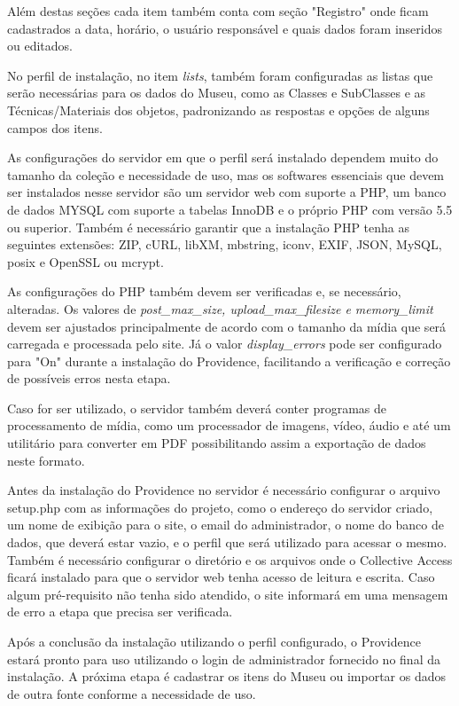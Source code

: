 \documentclass[a4paper,12pt,oneside,onecolumn,final,fleqn]{repUERJ}
\begin{document}
Além destas seções cada item também conta com seção "Registro" onde ficam cadastrados a data, horário, o usuário responsável e quais dados foram inseridos ou editados.

No perfil de instalação, no item \textit{lists}, também foram configuradas as listas que serão necessárias para os dados do Museu, como as Classes e SubClasses e as Técnicas/Materiais dos objetos, padronizando as respostas e opções de alguns campos dos itens.

As configurações do servidor em que o perfil será instalado dependem muito do tamanho da coleção e necessidade de uso, mas os softwares essenciais que devem ser instalados nesse servidor são um servidor web com suporte a PHP, um banco de dados MYSQL com suporte a tabelas InnoDB e o próprio PHP com versão 5.5 ou superior. Também é necessário garantir que a instalação PHP tenha as seguintes extensões: ZIP, cURL, libXM, mbstring, iconv, EXIF, JSON, MySQL, posix e OpenSSL ou mcrypt.

As configurações do PHP também devem ser verificadas e, se necessário, alteradas. Os valores de \textit{post\_max\_size, upload\_max\_filesize e memory\_limit} devem ser ajustados principalmente de acordo com o tamanho da mídia que será carregada e processada pelo site. Já o valor \textit{display\_errors} pode ser configurado para "On" durante a instalação do Providence, facilitando a verificação e correção de possíveis erros nesta etapa.

Caso for ser utilizado, o servidor também deverá conter programas de processamento de mídia, como um processador de imagens, vídeo, áudio e até um utilitário para converter em PDF possibilitando assim a exportação de dados neste formato.

Antes da instalação do Providence no servidor é necessário configurar o arquivo setup.php com as informações do projeto, como o endereço do servidor criado, um nome de exibição para o site, o email do administrador, o nome do banco de dados, que deverá estar vazio, e o perfil que será utilizado para acessar o mesmo. Também é necessário configurar o diretório e os arquivos onde o Collective Access ficará instalado para que o servidor web tenha acesso de leitura e escrita. Caso algum pré-requisito não tenha sido atendido, o site informará em uma mensagem de erro a etapa que precisa ser verificada.

Após a conclusão da instalação utilizando o perfil configurado, o Providence estará pronto para uso utilizando o login de administrador fornecido no final da instalação. A próxima etapa é cadastrar os itens do Museu ou importar os dados de outra fonte conforme a necessidade de uso.
\end{document}
